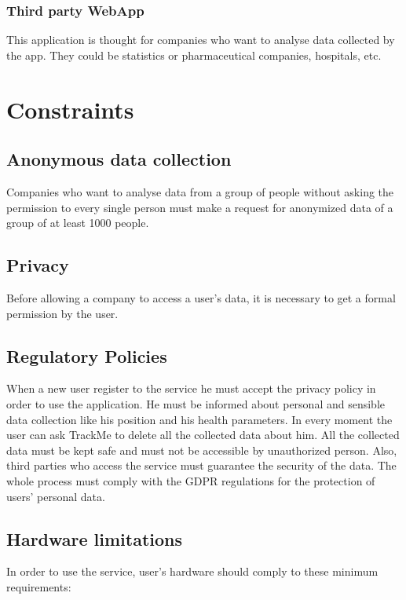 \subsubsection{Third party WebApp}
This application is thought for companies who want to analyse data collected by the app. They could be statistics or pharmaceutical companies, hospitals, etc.

\section{Constraints}

\subsection{Anonymous data collection}
Companies who want to analyse data from a group of people without asking the permission to every single person must make a request for anonymized data of a group of at least 1000 people.

\subsection{Privacy}
Before allowing a company to access a user’s data, it is necessary to get a formal permission by the user.

\subsection{Regulatory Policies}
When a new user register to the service he must accept the privacy policy in order to use the application.
He must be informed about personal and sensible data collection like his position and his health parameters.
In every moment the user can ask TrackMe to delete all the collected data about him.
All the collected data must be kept safe and must not be accessible by unauthorized person.
Also, third parties who access the service must guarantee the security of the data.
The whole process must comply with the GDPR regulations for the protection of users' personal data.

\subsection{Hardware limitations}\label{hardwareLimitation}
In order to use the service, user’s hardware should comply to these minimum requirements:

